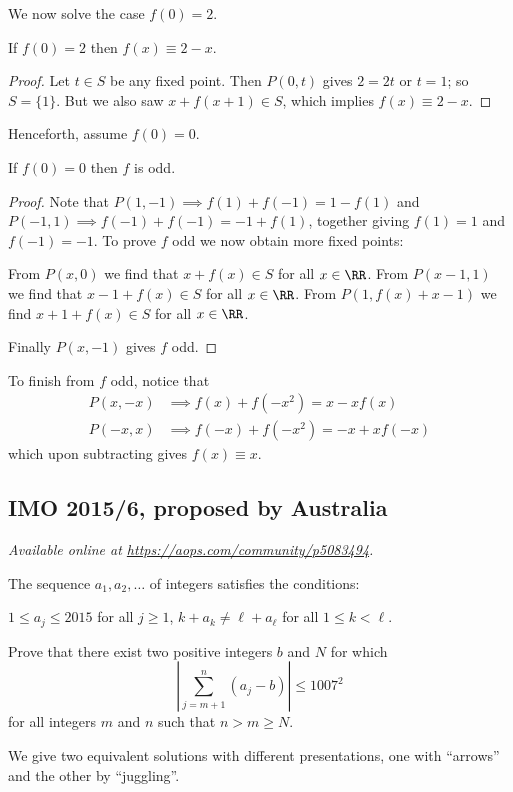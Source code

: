 \documentclass[11pt]{scrartcl}
\begin{document}
We now solve the case $f(0) = 2$.
\begin{claim*}
  If $f(0) = 2$ then $f(x) \equiv 2-x$.
\end{claim*}
\begin{proof}
  Let $t \in S$ be any fixed point.
  Then $P(0,t)$ gives $2 = 2t$ or $t = 1$;
  so $S = \{1\}$.
  But we also saw $x+f(x+1) \in S$,
  which implies $f(x) \equiv 2-x$.
\end{proof}

Henceforth, assume $f(0) = 0$.
\begin{claim*}
  If $f(0) = 0$ then $f$ is odd.
\end{claim*}
\begin{proof}
  Note that $P(1,-1) \implies f(1) + f(-1) = 1 - f(1)$
  and $P(-1,1) \implies f(-1) + f(-1) = -1 + f(1)$,
  together giving $f(1) = 1$ and $f(-1) = -1$.
  To prove $f$ odd we now obtain more fixed points:
  \begin{itemize}
    \ii From $P(x,0)$ we find that $x+f(x) \in S$ for all $x \in \RR$.
    \ii From $P(x-1,1)$ we find that $x-1+f(x) \in S$ for all $x \in \RR$.
    \ii From $P(1, f(x)+x-1)$ we find $x+1+f(x) \in S$ for all $x \in \RR$.
  \end{itemize}
  Finally $P(x, -1)$ gives $f$ odd.
\end{proof}
To finish from $f$ odd, notice that
\begin{align*}
  P(x,-x) &\implies f(x) + f(-x^2) = x - xf(x) \\
  P(-x,x) &\implies f(-x) + f(-x^2) = -x + xf(-x)
\end{align*}
which upon subtracting gives $f(x) \equiv x$.
\pagebreak

\subsection{IMO 2015/6, proposed by Australia}
\textsl{Available online at \url{https://aops.com/community/p5083494}.}
\begin{mdframed}[style=mdpurplebox,frametitle={Problem statement}]
The sequence $a_1,a_2,\dots$ of integers satisfies the conditions:
\begin{enumerate}[(i)]
  \ii $1\le a_j\le2015$ for all $j\ge1$,
  \ii $k+a_k\neq \ell+a_\ell$ for all $1\le k<\ell$.
\end{enumerate}
Prove that there exist two positive integers $b$ and $N$ for which
\[ \left\lvert\sum_{j=m+1}^n (a_j-b) \right\rvert \le 1007^2 \]
for all integers $m$ and $n$ such that $n > m\ge N$.
\end{mdframed}
We give two equivalent solutions with different presentations,
one with ``arrows'' and the other by ``juggling''.
\end{document}
